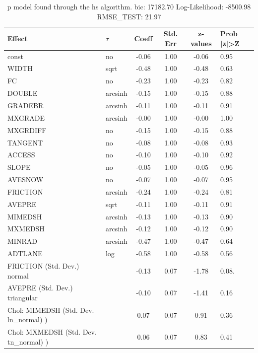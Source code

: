 \begin{table}
	\caption{p model found through the hs algorithm. bic: 17182.70 Log-Likelihood: -8500.98 RMSE_TEST: 21.97}
	\begin{center}
		\begin{tabular}{|l|l|c|c|c|l|}
			\hline
			Effect & $\tau$ & Coeff & Std. Err & z-values & Prob |z|>Z \\
			\hline
			const & no & -0.06 & 1.00 & -0.06 & 0.95 \\
			\hline
			WIDTH & sqrt & -0.48 & 1.00 & -0.48 & 0.63 \\
			\hline
			FC & no & -0.23 & 1.00 & -0.23 & 0.82 \\
			\hline
			DOUBLE & arcsinh & -0.15 & 1.00 & -0.15 & 0.88 \\
			\hline
			GRADEBR & arcsinh & -0.11 & 1.00 & -0.11 & 0.91 \\
			\hline
			MXGRADE & arcsinh & -0.00 & 1.00 & -0.00 & 1.00 \\
			\hline
			MXGRDIFF & no & -0.15 & 1.00 & -0.15 & 0.88 \\
			\hline
			TANGENT & no & -0.08 & 1.00 & -0.08 & 0.93 \\
			\hline
			ACCESS & no & -0.10 & 1.00 & -0.10 & 0.92 \\
			\hline
			SLOPE & no & -0.05 & 1.00 & -0.05 & 0.96 \\
			\hline
			AVESNOW & no & -0.07 & 1.00 & -0.07 & 0.95 \\
			\hline
			FRICTION & arcsinh & -0.24 & 1.00 & -0.24 & 0.81 \\
			\hline
			AVEPRE & sqrt & -0.11 & 1.00 & -0.11 & 0.91 \\
			\hline
			MIMEDSH & arcsinh & -0.13 & 1.00 & -0.13 & 0.90 \\
			\hline
			MXMEDSH & arcsinh & -0.12 & 1.00 & -0.12 & 0.90 \\
			\hline
			MINRAD & arcsinh & -0.47 & 1.00 & -0.47 & 0.64 \\
			\hline
			ADTLANE & log & -0.58 & 1.00 & -0.58 & 0.56 \\
			\hline
			FRICTION (Std. Dev.) normal &  & -0.13 & 0.07 & -1.78 & 0.08. \\
			\hline
			AVEPRE (Std. Dev.) triangular &  & -0.10 & 0.07 & -1.41 & 0.16 \\
			\hline
			 Chol: MIMEDSH (Std. Dev. ln_normal) ) &  & 0.07 & 0.07 & 0.91 & 0.36 \\
			\hline
			 Chol: MXMEDSH (Std. Dev. tn_normal) ) &  & 0.06 & 0.07 & 0.83 & 0.41 \\

\end{tabular}
\end{center}
\end{table}
